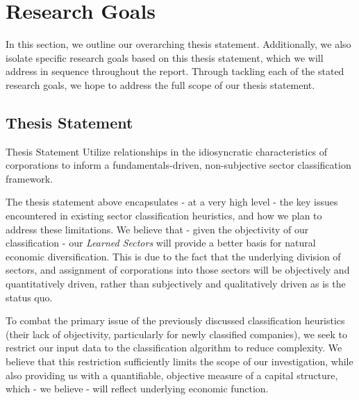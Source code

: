\documentclass[../main.tex]{subfiles}
\begin{document}
    
\chapter{Research Goals} \label{research_goals}
    
In this section, we outline our overarching thesis statement. Additionally, we also isolate specific research goals based on this thesis statement, which we will address in sequence throughout the report. Through tackling each of the stated research goals, we hope to address the full scope of our thesis statement.

\section{Thesis Statement} \label{research_goals:thesis_statement}

\begin{center}
    \begin{minipage}{0.7\textwidth}
        \begin{bclogo}[couleur=blue!30, arrondi=0.1, logo=\bcloupe, ombre=false]{\;Thesis Statement}
            Utilize relationships in the idiosyncratic characteristics of corporations to inform a fundamentals-driven, non-subjective sector classification framework.
        \end{bclogo}
    \end{minipage}
\end{center}

\vspace{1em}

The thesis statement above encapsulates - at a very high level - the key issues encountered in existing sector classification heuristics, and how we plan to address these limitations. We believe that - given the objectivity of our classification - our \textit{Learned Sectors} will provide a better basis for natural economic diversification. This is due to the fact that the underlying division of sectors, and assignment of corporations into those sectors will be objectively and quantitatively driven, rather than subjectively and qualitatively driven as is the status quo.

To combat the primary issue of the previously discussed classification heuristics (their lack of objectivity, particularly for newly classified companies), we seek to restrict our input data to the classification algorithm to reduce complexity. We believe that this restriction sufficiently limits the scope of our investigation, while also providing us with a quantifiable, objective measure of a capital structure, which - we believe - will reflect underlying economic function.
\end{document}
